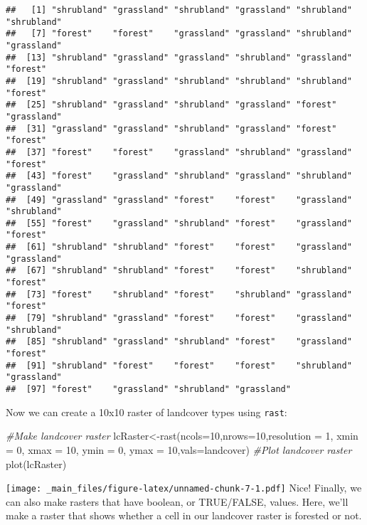 \documentclass[
]{book}
\newenvironment{Shaded}{\begin{snugshade}}{\end{snugshade}}
\newcommand{\AttributeTok}[1]{\textcolor[rgb]{0.77,0.63,0.00}{#1}}
\newcommand{\CommentTok}[1]{\textcolor[rgb]{0.56,0.35,0.01}{\textit{#1}}}
\newcommand{\DecValTok}[1]{\textcolor[rgb]{0.00,0.00,0.81}{#1}}
\newcommand{\FunctionTok}[1]{\textcolor[rgb]{0.00,0.00,0.00}{#1}}
\newcommand{\NormalTok}[1]{#1}
\newcommand{\OtherTok}[1]{\textcolor[rgb]{0.56,0.35,0.01}{#1}}
\begin{document}
\begin{verbatim}
##   [1] "shrubland" "grassland" "shrubland" "grassland" "shrubland" "shrubland"
##   [7] "forest"    "forest"    "grassland" "grassland" "shrubland" "grassland"
##  [13] "shrubland" "grassland" "grassland" "shrubland" "grassland" "forest"   
##  [19] "shrubland" "grassland" "shrubland" "shrubland" "shrubland" "forest"   
##  [25] "shrubland" "grassland" "shrubland" "grassland" "forest"    "grassland"
##  [31] "grassland" "grassland" "shrubland" "grassland" "forest"    "forest"   
##  [37] "forest"    "forest"    "grassland" "shrubland" "grassland" "forest"   
##  [43] "forest"    "grassland" "shrubland" "grassland" "shrubland" "grassland"
##  [49] "grassland" "grassland" "forest"    "forest"    "grassland" "shrubland"
##  [55] "forest"    "grassland" "shrubland" "forest"    "grassland" "forest"   
##  [61] "shrubland" "shrubland" "forest"    "forest"    "grassland" "grassland"
##  [67] "shrubland" "shrubland" "forest"    "forest"    "shrubland" "forest"   
##  [73] "forest"    "shrubland" "forest"    "shrubland" "grassland" "forest"   
##  [79] "shrubland" "grassland" "forest"    "forest"    "grassland" "shrubland"
##  [85] "shrubland" "grassland" "shrubland" "forest"    "grassland" "forest"   
##  [91] "shrubland" "forest"    "forest"    "forest"    "shrubland" "grassland"
##  [97] "forest"    "grassland" "shrubland" "grassland"
\end{verbatim}

Now we can create a 10x10 raster of landcover types using \texttt{rast}:

\begin{Shaded}
\begin{Highlighting}[]
\CommentTok{\#Make landcover raster}
\NormalTok{lcRaster}\OtherTok{\textless{}{-}}\FunctionTok{rast}\NormalTok{(}\AttributeTok{ncols=}\DecValTok{10}\NormalTok{,}\AttributeTok{nrows=}\DecValTok{10}\NormalTok{,}\AttributeTok{resolution =} \DecValTok{1}\NormalTok{, }\AttributeTok{xmin =} \DecValTok{0}\NormalTok{, }\AttributeTok{xmax =} \DecValTok{10}\NormalTok{, }\AttributeTok{ymin =} \DecValTok{0}\NormalTok{, }\AttributeTok{ymax =} \DecValTok{10}\NormalTok{,}\AttributeTok{vals=}\NormalTok{landcover)}
\CommentTok{\#Plot landcover raster}
\FunctionTok{plot}\NormalTok{(lcRaster)}
\end{Highlighting}
\end{Shaded}

\texttt{[image: \_main\_files/figure-latex/unnamed-chunk-7-1.pdf]}
Nice! Finally, we can also make rasters that have boolean, or TRUE/FALSE, values. Here, we'll make a raster that shows whether a cell in our landcover raster is forested or not.
\end{document}
